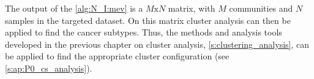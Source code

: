 The output of the \cref{alg:N_I:mev} is a $M\text{x}N$ matrix, with $M$ communities and $N$ samples in the targeted dataset. On this matrix cluster analysis can then be applied to find the cancer subtypes. Thus, the methods and analysis tools developed in the previous chapter on cluster analysis, \cref{s:clustering_analysis}, can be applied to find the appropriate cluster configuration (see \cref{s:ap:P0_cs_analysis}).








